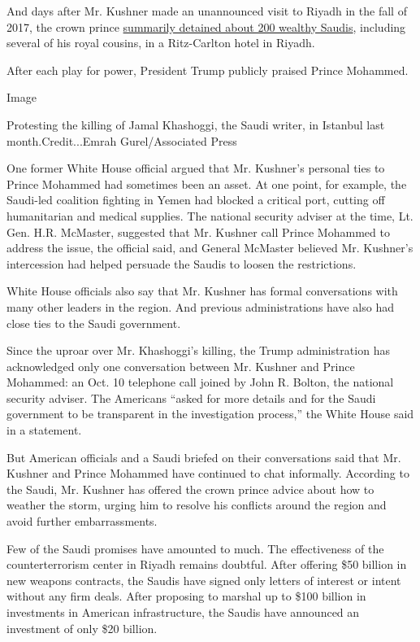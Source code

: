 And days after Mr. Kushner made an unannounced visit to Riyadh in the
fall of 2017, the crown prince
\href{https://www.nytimes.com/2018/03/11/world/middleeast/saudi-arabia-corruption-mohammed-bin-salman.html?module=inline}{summarily
detained about 200 wealthy Saudis}, including several of his royal
cousins, in a Ritz-Carlton hotel in Riyadh.

After each play for power, President Trump publicly praised Prince
Mohammed.

Image

Protesting the killing of Jamal Khashoggi, the Saudi writer, in Istanbul
last month.Credit...Emrah Gurel/Associated Press

One former White House official argued that Mr. Kushner's personal ties
to Prince Mohammed had sometimes been an asset. At one point, for
example, the Saudi-led coalition fighting in Yemen had blocked a
critical port, cutting off humanitarian and medical supplies. The
national security adviser at the time, Lt. Gen. H.R. McMaster, suggested
that Mr. Kushner call Prince Mohammed to address the issue, the official
said, and General McMaster believed Mr. Kushner's intercession had
helped persuade the Saudis to loosen the restrictions.

White House officials also say that Mr. Kushner has formal conversations
with many other leaders in the region. And previous administrations have
also had close ties to the Saudi government.

Since the uproar over Mr. Khashoggi's killing, the Trump administration
has acknowledged only one conversation between Mr. Kushner and Prince
Mohammed: an Oct. 10 telephone call joined by John R. Bolton, the
national security adviser. The Americans ``asked for more details and
for the Saudi government to be transparent in the investigation
process,'' the White House said in a statement.

But American officials and a Saudi briefed on their conversations said
that Mr. Kushner and Prince Mohammed have continued to chat informally.
According to the Saudi, Mr. Kushner has offered the crown prince advice
about how to weather the storm, urging him to resolve his conflicts
around the region and avoid further embarrassments.

Few of the Saudi promises have amounted to much. The effectiveness of
the counterterrorism center in Riyadh remains doubtful. After offering
\$50 billion in new weapons contracts, the Saudis have signed only
letters of interest or intent without any firm deals. After proposing to
marshal up to \$100 billion in investments in American infrastructure,
the Saudis have announced an investment of only \$20 billion.

